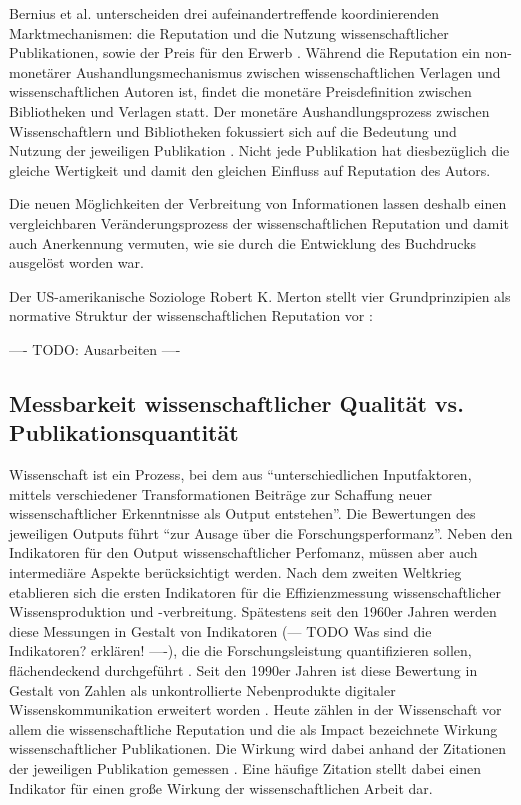 Bernius et al. unterscheiden drei aufeinandertreffende koordinierenden Marktmechanismen: die Reputation und die Nutzung wissenschaftlicher Publikationen, sowie der Preis für den Erwerb \cite{suchen}. Während die Reputation ein non-monetärer Aushandlungsmechanismus zwischen wissenschaftlichen Verlagen und wissenschaftlichen Autoren ist, findet die monetäre Preisdefinition zwischen Bibliotheken und Verlagen statt. Der monetäre Aushandlungsprozess zwischen Wissenschaftlern und Bibliotheken fokussiert sich auf die Bedeutung und Nutzung der jeweiligen Publikation \cite{cite:21a}. Nicht jede Publikation hat diesbezüglich die gleiche Wertigkeit \cite{suchen} und damit den gleichen Einfluss auf Reputation des Autors. 

Die neuen Möglichkeiten der Verbreitung von Informationen lassen deshalb einen vergleichbaren Veränderungsprozess der wissenschaftlichen Reputation und damit auch Anerkennung vermuten, wie sie durch die Entwicklung des Buchdrucks ausgelöst worden war.\cite{hanekop_2006} 

Der US-amerikanische Soziologe Robert K. Merton stellt vier Grundprinzipien als normative Struktur der wissenschaftlichen Reputation vor \cite{Merton_1985}:

---- TODO: Ausarbeiten ----

\subsection{Messbarkeit wissenschaftlicher Qualität vs. Publikationsquantität}
Wissenschaft ist ein Prozess, bei dem aus “unterschiedlichen Inputfaktoren, mittels verschiedener Transformationen Beiträge zur Schaffung neuer wissenschaftlicher Erkenntnisse als Output entstehen”\cite{Jansen_2007}. Die Bewertungen des jeweiligen Outputs führt “zur Ausage über die Forschungsperformanz”. Neben den Indikatoren für den Output wissenschaftlicher Perfomanz, müssen aber auch intermediäre Aspekte berücksichtigt werden\cite{schmoch_2009}. Nach dem zweiten Weltkrieg etablieren sich die ersten Indikatoren für die Effizienzmessung wissenschaftlicher Wissensproduktion und -verbreitung. Spätestens seit den 1960er Jahren werden diese Messungen in Gestalt von Indikatoren (--- TODO Was sind die Indikatoren? erklären! ----), die die Forschungsleistung quantifizieren sollen, flächendeckend durchgeführt \cite{suchen}. Seit den 1990er Jahren ist diese Bewertung in Gestalt von Zahlen als unkontrollierte Nebenprodukte digitaler Wissenskommunikation erweitert worden \cite{angermueller_2010}. Heute zählen in der Wissenschaft vor allem die wissenschaftliche Reputation und die als Impact bezeichnete Wirkung wissenschaftlicher Publikationen\cite{herb_open_2013}. Die Wirkung wird dabei anhand der Zitationen der jeweiligen Publikation gemessen \cite{suchen}. Eine häufige Zitation stellt dabei einen Indikator für einen große Wirkung der wissenschaftlichen Arbeit dar. 


